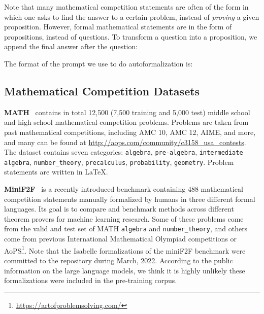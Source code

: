 \documentclass{article}
\begin{document}
Note that many mathematical competition statements are often of the form in which one asks to find the answer to a certain problem, instead of \emph{proving} a given proposition. However, formal mathematical statements are in the form of propositions, instead of questions. To transform a question into a proposition, we append the final answer after the question:


The format of the prompt we use to do autoformalization is:







\subsection{Mathematical Competition Datasets}



{\bf MATH}~\citep{hendrycks2021math}
contains in total 12,500 (7,500 training and 5,000 test) middle school and high school mathematical competition problems. Problems are taken from past mathematical competitions, including
AMC 10, AMC 12, AIME, and more, and many can be found at \url{http://aops.com/community/c3158_usa_contests}. The dataset contains seven categories: \texttt{algebra}, \texttt{pre-algebra}, \texttt{intermediate algebra}, \texttt{number\_theory}, \texttt{precalculus}, \texttt{probability}, \texttt{geometry}. Problem statements are written in LaTeX.

{\bf MiniF2F}~\citep{zheng2021minif2f}
is a recently introduced benchmark containing 488 mathematical competition statements manually formalized by humans in three different formal languages. Its goal is to compare and benchmark methods across different theorem provers for machine learning research. Some of these problems come from the valid and test set of MATH \texttt{algebra} and \texttt{number\_theory}, and others come from previous International Mathematical Olympiad competitions or AoPS\footnote{\url{https://artofproblemsolving.com/}}. Note that the Isabelle formalizations of the miniF2F benchmark were committed to the repository during March, 2022. According to the public information on the large language models, we think it is highly unlikely these formalizations were included in the pre-training corpus.
\end{document}

